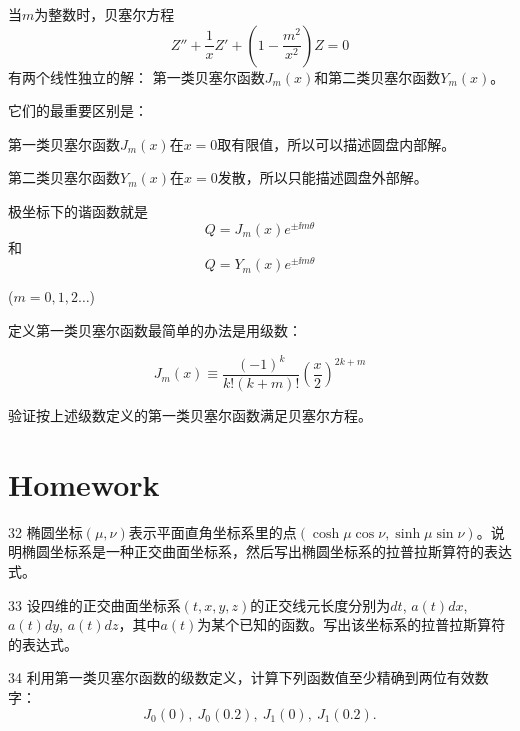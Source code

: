 \documentclass[CJK]{beamer}
\begin{document}
\begin{frame}
  \bch
  当$m$为整数时，贝塞尔方程
  $$  Z'' + \frac{1}{x} Z' + (1-\frac{m^2}{x^2}) Z = 0$$
  有两个线性独立的解：
  {\blue 第一类贝塞尔函数$J_m(x)$和第二类贝塞尔函数$Y_m(x)$}。

  \skiplines
  
  它们的最重要区别是：
  \bitem
\item{ 第一类贝塞尔函数$J_m(x)$在$x=0$取有限值，所以可以描述圆盘内部解。}
\item{ 第二类贝塞尔函数$Y_m(x)$在$x=0$发散，所以只能描述圆盘外部解。}  
  \eitem
  \ech
\end{frame}

\begin{frame}
  \bch
  极坐标下的谐函数就是
  $$ Q = J_m(x)e^{\pm \ii m\theta} $$
  和
  $$ Q = Y_m(x)e^{\pm \ii m\theta} $$

  ($m=0,1,2\ldots$)
  \ech
\end{frame}

\begin{frame}
  \bch
  定义第一类贝塞尔函数最简单的办法是用级数：

  $$J_m(x) \equiv\frac{(-1)^k}{k!(k+m)!} \left(\frac{x}{2}\right)^{2k+m}$$
  
  \ech
\end{frame}


\begin{frame}
  \bch

  
  验证按上述级数定义的第一类贝塞尔函数满足贝塞尔方程。
  \ech
\end{frame}


\section{Homework}

\begin{frame}
  \bch
  \bitem
\item[32]{椭圆坐标$(\mu,\nu)$表示平面直角坐标系里的点$(\cosh \mu \cos\nu, \sinh\mu\sin\nu)$。说明椭圆坐标系是一种正交曲面坐标系，然后写出椭圆坐标系的拉普拉斯算符的表达式。}
\item[33]{设四维的正交曲面坐标系$(t,x,y,z)$的正交线元长度分别为$dt$, $a(t)dx$, $a(t)dy$, $a(t)dz$，其中$a(t)$为某个已知的函数。写出该坐标系的拉普拉斯算符的表达式。}
\item[34]{利用第一类贝塞尔函数的级数定义，计算下列函数值至少精确到两位有效数字：
  $$J_0(0),\ J_0(0.2),\ J_1(0),\ J_1(0.2).$$}
  \eitem
  \ech
\end{frame}
\end{document}
